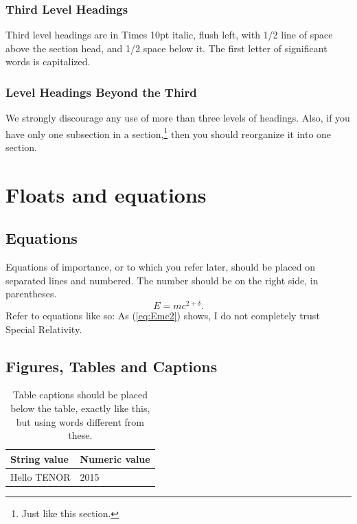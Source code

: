 \documentclass{article}
\begin{document}
\subsubsection{Third Level Headings}
Third level headings are in Times 10pt italic, flush left,
with 1/2 line of space above the section head, and 1/2 space below it.
The first letter of significant words is capitalized.

\subsubsection{Level Headings Beyond the Third}
We strongly discourage any use of
more than three levels of headings.
Also, if you have only one subsection in a section,\footnote{Just like this section.}
then you should reorganize it into one section.

\section{Floats and equations}

\subsection{Equations}
Equations of importance, 
or to which you refer later,
should be placed on separated lines and numbered.
The number should be on the right side, in parentheses.
\begin{equation}
E=mc^{2+\delta}.
\label{eq:Emc2}
\end{equation}
Refer to equations like so:
As (\ref{eq:Emc2}) shows, 
I do not completely trust Special Relativity.

\subsection{Figures, Tables and Captions}
\begin{table}[t]
 \begin{center}
 \begin{tabular}{|l|l|}
  \hline
  String value & Numeric value \\
  \hline
  Hello TENOR  & 2015 \\
  \hline
 \end{tabular}
\end{center}
 \caption{Table captions should be placed below the table, exactly like this,
 but using words different from these.}
 \label{tab:example}
\end{table}
\end{document}
